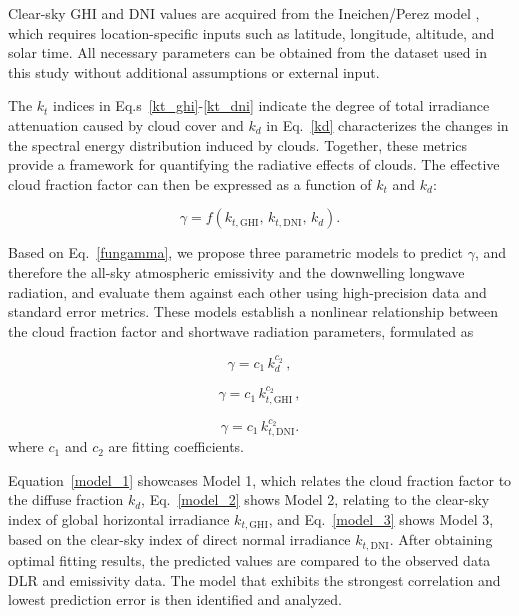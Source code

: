 \documentclass[preprint,12pt]{elsarticle}
\begin{document}
Clear-sky GHI and DNI values are acquired from %
the Ineichen/Perez model \cite{ineichen2002new,ineichen2008broadband,ineichen2016validation}, which requires location-specific inputs such as latitude, longitude, altitude, and solar time. All necessary parameters can be obtained from the dataset used in this study without additional assumptions or external input.

The $k_t$ indices in Eq.s~\eqref{kt_ghi}-\eqref{kt_dni} indicate the degree of total irradiance attenuation caused by cloud cover and $k_d$ in Eq.~\eqref{kd} characterizes the changes in the spectral energy distribution induced by clouds. Together, these metrics provide a framework for quantifying the radiative effects of clouds. The effective cloud fraction factor can then be expressed as a function of $k_t$ and $k_d$:

\begin{equation} \label{fungamma}
  \gamma  = f\left( k_{t,\mathrm{GHI}}, \, k_{t,\mathrm{DNI}}, \, k_d\right).
\end{equation}

Based on Eq.~\eqref{fungamma}, we propose three parametric models to predict $\gamma$, and therefore the all-sky atmospheric emissivity and the downwelling longwave radiation, and evaluate them against each other using high-precision data and standard error metrics. These models establish a nonlinear relationship between the cloud fraction factor and shortwave radiation parameters, formulated as  

\begin{equation} \label{model_1} 
    \gamma = c_1\,k_d^{c_2}\,,
\end{equation}

\begin{equation} \label{model_2}
\gamma = c_1 \,k_{t,\mathrm{GHI}}^{c_2}\,,
\end{equation}

\begin{equation} \label{model_3}
 \gamma = c_1 \,k_{t,\mathrm{DNI}}^{c_2}.
\end{equation}
where $c_1$ and $c_2$ are fitting coefficients. 

Equation~\eqref{model_1} showcases Model 1, which relates the cloud fraction factor to the diffuse fraction $k_d$, Eq.~\eqref{model_2} shows Model 2, relating to the clear-sky index of global horizontal irradiance $k_{t,\mathrm{GHI}}$, and Eq.~\eqref{model_3} shows Model 3, based on the clear-sky index of direct normal irradiance $k_{t,\mathrm{DNI}}$. After obtaining optimal fitting results, the predicted values are compared to the observed data DLR and emissivity data. The model that exhibits the strongest correlation and lowest prediction error is then identified and analyzed. 
\end{document}
